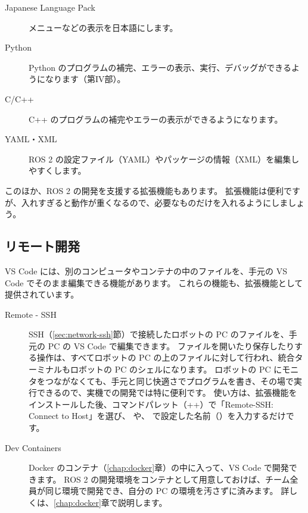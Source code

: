 \begin{description}
  \item[Japanese Language Pack] メニューなどの表示を日本語にします。
  \item[Python] Python のプログラムの補完、エラーの表示、実行、デバッグができるようになります（第IV部）。
  \item[C/C++] C++ のプログラムの補完やエラーの表示ができるようになります。
  \item[YAML・XML] ROS 2 の設定ファイル（YAML）やパッケージの情報（XML）を編集しやすくします。
\end{description}

このほか、ROS 2 の開発を支援する拡張機能もあります。
拡張機能は便利ですが、入れすぎると動作が重くなるので、必要なものだけを入れるようにしましょう。

\subsection{リモート開発}
\label{sec:editor-remote}

VS Code には、別のコンピュータやコンテナの中のファイルを、手元の VS Code でそのまま編集できる機能があります。
これらの機能も、拡張機能として提供されています。

\begin{description}
  \item[Remote - SSH]
    SSH（\ref{sec:network-ssh}節）で接続したロボットの PC のファイルを、手元の PC の VS Code で編集できます。
    ファイルを開いたり保存したりする操作は、すべてロボットの PC の上のファイルに対して行われ、統合ターミナルもロボットの PC のシェルになります。
    ロボットの PC にモニタをつながなくても、手元と同じ快適さでプログラムを書き、その場で実行できるので、実機での開発では特に便利です。
    使い方は、拡張機能をインストールした後、コマンドパレット（++）で「Remote-SSH: Connect to Host」を選び、 や、 で設定した名前（）を入力するだけです。
  \item[Dev Containers]
    Docker のコンテナ（\ref{chap:docker}章）の中に入って、VS Code で開発できます。
    ROS 2 の開発環境をコンテナとして用意しておけば、チーム全員が同じ環境で開発でき、自分の PC の環境を汚さずに済みます。
    詳しくは、\ref{chap:docker}章で説明します。
\end{description}

